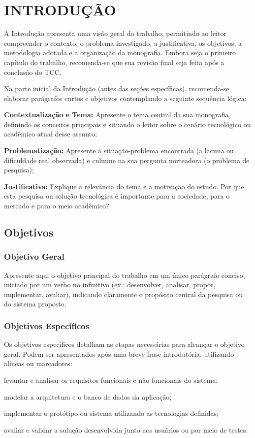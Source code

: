 \chapter{INTRODUÇÃO}
A Introdução apresenta uma visão geral do trabalho, permitindo ao leitor compreender o contexto, o problema investigado, a justificativa, os objetivos, a metodologia adotada e a organização da monografia. Embora seja o primeiro capítulo do trabalho, recomenda-se que sua revisão final seja feita após a conclusão do TCC.

Na parte inicial da Introdução (antes das seções específicas), recomenda-se elaborar parágrafos curtos e objetivos contemplando a seguinte sequência lógica:
\begin{uemaenum}
    \item \textbf{Contextualização e Tema:} Apresente o tema central da sua monografia, definindo os conceitos principais e situando o leitor sobre o cenário tecnológico ou acadêmico atual desse assunto;
    \item \textbf{Problematização:} Apresente a situação-problema encontrada (a lacuna ou dificuldade real observada) e culmine na sua pergunta norteadora (o problema de pesquisa);
    \item \textbf{Justificativa:} Explique a relevância do tema e a motivação do estudo. Por que esta pesquisa ou solução tecnológica é importante para a sociedade, para o mercado e para o meio acadêmico?
\end{uemaenum}

\section{Objetivos}

\subsection{Objetivo Geral}
Apresente aqui o objetivo principal do trabalho em um único parágrafo conciso, iniciado por um verbo no infinitivo (ex.: desenvolver, analisar, propor, implementar, avaliar), indicando claramente o propósito central da pesquisa ou do sistema proposto.

\subsection{Objetivos Específicos}
Os objetivos específicos detalham as etapas necessárias para alcançar o objetivo geral. Podem ser apresentados após uma breve frase introdutória, utilizando alíneas ou marcadores:
\begin{uemaball}
    \item levantar e analisar os requisitos funcionais e não funcionais do sistema;
    \item modelar a arquitetura e o banco de dados da aplicação;
    \item implementar o protótipo ou sistema utilizando as tecnologias definidas;
    \item avaliar e validar a solução desenvolvida junto aos usuários ou por meio de testes.
\end{uemaball}

